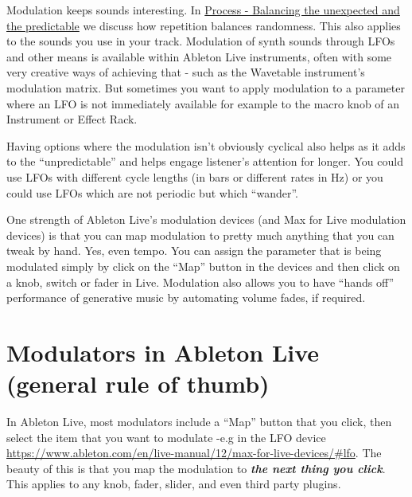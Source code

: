 \documentclass[
  12pt,
  letterpaper,
  oneside,
  open=any]{scrbook}
\begin{document}
\begin{tcolorbox}[enhanced jigsaw, titlerule=0mm, toprule=.15mm, bottomrule=.15mm, colframe=quarto-callout-tip-color-frame, bottomtitle=1mm, opacityback=0, breakable, leftrule=.75mm, coltitle=black, colback=white, rightrule=.15mm, arc=.35mm, toptitle=1mm, title=\textcolor{quarto-callout-tip-color}{\faLightbulb}\hspace{0.5em}{Key idea}, opacitybacktitle=0.6, left=2mm, colbacktitle=quarto-callout-tip-color!10!white]

Modulation keeps sounds interesting. In
\hyperref[Chapter-009-Process-Balance_unexpected_and_predictable]{Process
- Balancing the unexpected and the predictable} we discuss how
repetition balances randomness. This also applies to the sounds you use
in your track. Modulation of synth sounds through LFOs and other means
is available within Ableton Live instruments, often with some very
creative ways of achieving that - such as the Wavetable instrument's
modulation matrix. But sometimes you want to apply modulation to a
parameter where an LFO is not immediately available for example to the
macro knob of an Instrument or Effect Rack.

Having options where the modulation isn't obviously cyclical also helps
as it adds to the ``unpredictable'' and helps engage listener's
attention for longer. You could use LFOs with different cycle lengths
(in bars or different rates in Hz) or you could use LFOs which are not
periodic but which ``wander''.

One strength of Ableton Live's modulation devices (and Max for Live
modulation devices) is that you can map modulation to pretty much
anything that you can tweak by hand. Yes, even tempo. You can assign the
parameter that is being modulated simply by click on the ``Map'' button
in the devices and then click on a knob, switch or fader in Live.
Modulation also allows you to have ``hands off'' performance of
generative music by automating volume fades, if required.

\end{tcolorbox}

\section{Modulators in Ableton Live (general rule of
thumb)}\label{modulators-in-ableton-live-general-rule-of-thumb}

In Ableton Live, most modulators include a ``Map'' button that you
click, then select the item that you want to modulate -e.g in the LFO
device
\url{https://www.ableton.com/en/live-manual/12/max-for-live-devices/\#lfo}.
The beauty of this is that you map the modulation to \textbf{\emph{the
next thing you click}}. This applies to any knob, fader, slider, and
even third party plugins.
\end{document}
